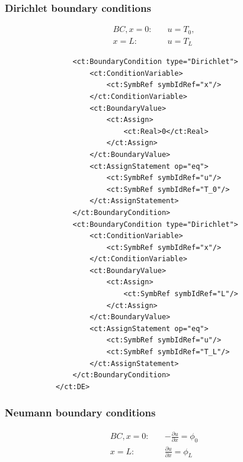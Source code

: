 \subsubsection*{Dirichlet boundary conditions}

\begin{align}
BC, x=0: \quad & u = T_0, \nonumber \\
	x=L: 	\quad & u = T_L \nonumber 
\end{align}

\lstset{language=XML}
\begin{lstlisting}
                <ct:BoundaryCondition type="Dirichlet">
                    <ct:ConditionVariable>
                        <ct:SymbRef symbIdRef="x"/>
                    </ct:ConditionVariable>
                    <ct:BoundaryValue>
                        <ct:Assign>
                            <ct:Real>0</ct:Real>
                        </ct:Assign>
                    </ct:BoundaryValue>
                    <ct:AssignStatement op="eq">
                        <ct:SymbRef symbIdRef="u"/>
                        <ct:SymbRef symbIdRef="T_0"/>
                    </ct:AssignStatement>
                </ct:BoundaryCondition>
                <ct:BoundaryCondition type="Dirichlet">
                    <ct:ConditionVariable>
                        <ct:SymbRef symbIdRef="x"/>
                    </ct:ConditionVariable>
                    <ct:BoundaryValue>
                        <ct:Assign>
                            <ct:SymbRef symbIdRef="L"/>
                        </ct:Assign>
                    </ct:BoundaryValue>
                    <ct:AssignStatement op="eq">
                        <ct:SymbRef symbIdRef="u"/>
                        <ct:SymbRef symbIdRef="T_L"/>
                    </ct:AssignStatement>
                </ct:BoundaryCondition>
            </ct:DE>
\end{lstlisting}


\subsubsection*{Neumann boundary conditions}

\begin{align}
BC, x=0: \quad & -\frac{\partial u}{\partial x} = \phi_0 \nonumber\\
	x=L: \quad & \frac{\partial u}{\partial x} = \phi_L\nonumber
\end{align}

